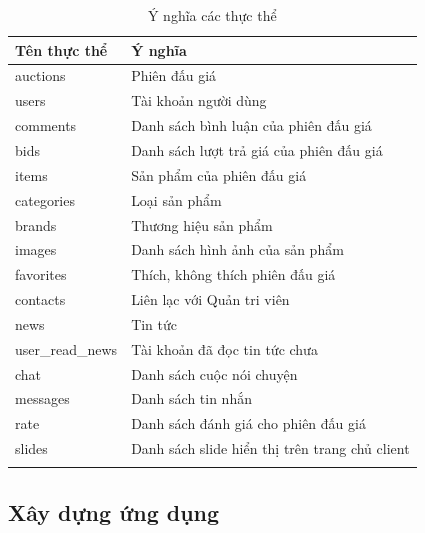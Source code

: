 \documentclass{article}
\begin{document}
    \begin{longtable}{| p{} | p{} |} 
    \hline
        \bfseries Tên thực thể & \bfseries Ý nghĩa\\\hline
        auctions & Phiên đấu giá\\\hline
        users & Tài khoản người dùng\\\hline
        comments & Danh sách bình luận của phiên đấu giá\\\hline
        bids& Danh sách lượt trả giá của phiên đấu giá\\\hline
        items& Sản phẩm của phiên đấu giá\\\hline
        categories& Loại sản phẩm\\\hline
        brands& Thương hiệu sản phẩm\\\hline
        images& Danh sách hình ảnh của sản phẩm\\\hline
        favorites& Thích, không thích phiên đấu giá\\\hline
        contacts& Liên lạc với Quản tri viên\\\hline
        news& Tin tức\\\hline
        user\_read\_news& Tài khoản đã đọc tin tức chưa\\\hline
        chat& Danh sách cuộc nói chuyện\\\hline
        messages& Danh sách tin nhắn\\\hline
        rate& Danh sách đánh giá cho phiên đấu giá\\\hline
        slides & Danh sách slide hiển thị trên trang chủ client\\\hline
    \caption{Ý nghĩa các thực thể}
    \label{bang48}
    \end{longtable}
\subsection{Xây dựng ứng dụng}
\end{document}
